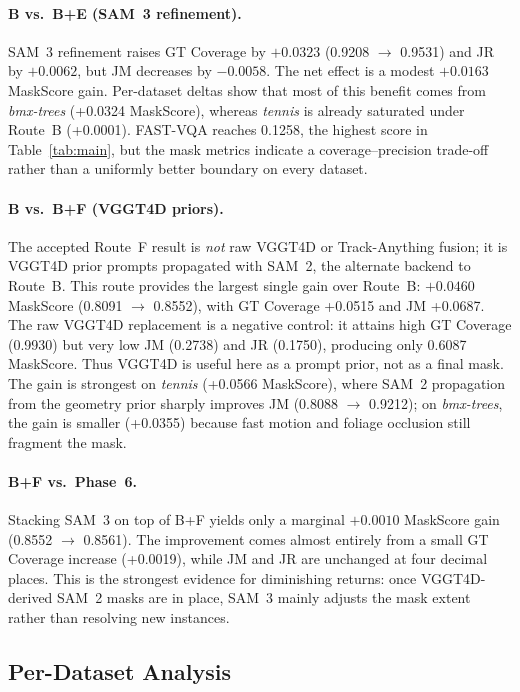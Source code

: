 \paragraph{B vs.\ B+E (SAM~3 refinement).}
SAM~3 refinement raises GT Coverage by $+0.0323$ (0.9208 $\to$ 0.9531) and JR by
$+0.0062$, but JM decreases by $-0.0058$. The net effect is a modest $+0.0163$
MaskScore gain. Per-dataset deltas show that most of this benefit comes from
\emph{bmx-trees} (+0.0324 MaskScore), whereas \emph{tennis} is already saturated under
Route~B (+0.0001). FAST-VQA reaches 0.1258, the highest score in Table~\ref{tab:main},
but the mask metrics indicate a coverage--precision trade-off rather than a uniformly
better boundary on every dataset.

\paragraph{B vs.\ B+F (VGGT4D priors).}
The accepted Route~F result is \emph{not} raw VGGT4D or Track-Anything fusion; it is
VGGT4D prior prompts propagated with SAM~2, the alternate backend to Route~B. This route
provides the largest single gain over Route~B: $+0.0460$ MaskScore (0.8091 $\to$
0.8552), with GT Coverage +0.0515 and JM +0.0687. The raw VGGT4D replacement is a
negative control: it attains high GT Coverage (0.9930) but very low JM (0.2738) and
JR (0.1750), producing only 0.6087 MaskScore. Thus VGGT4D is useful here as a prompt
prior, not as a final mask. The gain is strongest on \emph{tennis} (+0.0566
MaskScore), where SAM~2 propagation from the geometry prior sharply improves JM
(0.8088 $\to$ 0.9212); on \emph{bmx-trees}, the gain is smaller (+0.0355) because
fast motion and foliage occlusion still fragment the mask.

\paragraph{B+F vs.\ Phase~6.}
Stacking SAM~3 on top of B+F yields only a marginal $+0.0010$ MaskScore gain
(0.8552 $\to$ 0.8561). The improvement comes almost entirely from a small GT Coverage
increase (+0.0019), while JM and JR are unchanged at four decimal places. This is the
strongest evidence for diminishing returns: once VGGT4D-derived SAM~2 masks are in
place, SAM~3 mainly adjusts the mask extent rather than resolving new instances.

\subsection{Per-Dataset Analysis}
\label{sec:exp:per_dataset}

